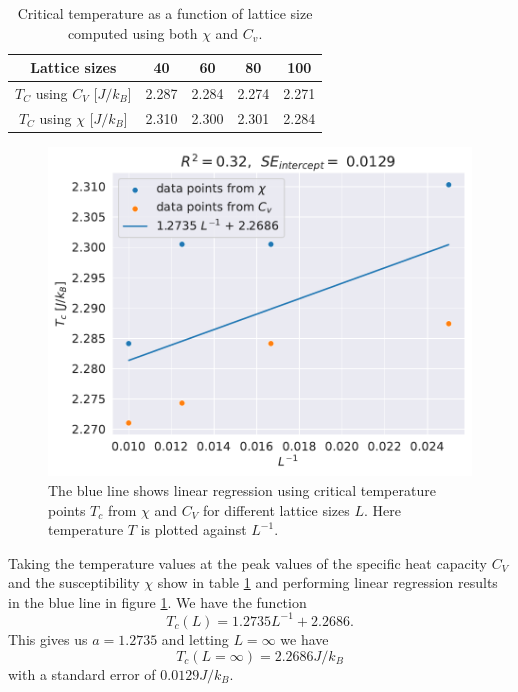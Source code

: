 \documentclass[english,notitlepage,reprint,nofootinbib]{revtex4-1}  %
\begin{document}
\begin{table}
    \centering
    \caption{Critical temperature as a function of lattice size computed using both $\chi$ and $C_v$.}
    \label{tab:critical_T}
    \begin{tabular}{|c|c|c|c|c|}
        \hline
        Lattice sizes                & 40    & 60    & 80    & 100   \\
        \hline
        $T_C$ using $C_V$ [$J/k_B$]  & 2.287 & 2.284 & 2.274 & 2.271 \\
        \hline
        $T_C$ using $\chi$ [$J/k_B$] & 2.310 & 2.300 & 2.301 & 2.284 \\
        \hline
    \end{tabular}
\end{table}
\begin{figure}[H]
    \centering
    \includegraphics[width=.5\textwidth]{../figures/linregress.pdf}
    \caption{The blue line shows linear regression using critical temperature points $T_c$ from $\chi$ and $C_V$ for different lattice sizes $L$. Here temperature $T$ is plotted against $L^{-1}$.}
    \label{fig:linregress}
\end{figure}
Taking the temperature values at the peak values of the specific heat capacity $C_V$ and the susceptibility $\chi$ show in table \ref{tab:critical_T} and performing linear regression results in the blue line in figure \ref{fig:linregress}. We have the function
\begin{equation}
    T_c(L) = 1.2735 L^{-1} + 2.2686.
\end{equation}
This gives us $a=1.2735$ and letting $L=\infty$ we have
\begin{equation}
    T_c(L=\infty) = 2.2686 J/k_B
\end{equation}
with a standard error of $0.0129 J/k_B$.
\end{document}
